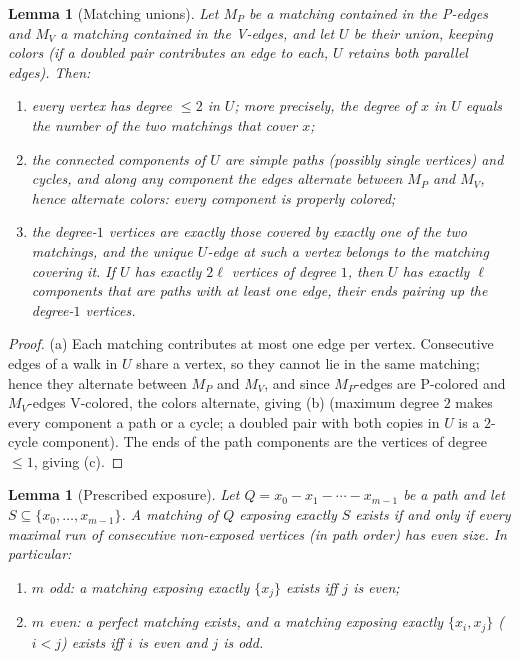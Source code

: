 \documentclass[11pt]{article}
\newtheorem{lemma}[theorem]{Lemma}
\theoremstyle{definition}
\begin{document}
\begin{lemma}[Matching unions]\label{lem:munion}
Let $M_P$ be a matching contained in the P-edges and $M_V$ a matching contained in the
V-edges, and let $U$ be their union, keeping colors (if a doubled pair contributes an
edge to each, $U$ retains both parallel edges). Then:
\begin{enumerate}
\item[(a)] every vertex has degree $\le 2$ in $U$; more precisely, the degree of $x$
in $U$ equals the number of the two matchings that cover $x$;
\item[(b)] the connected components of $U$ are simple paths (possibly single vertices)
and cycles, and along any component the edges alternate between $M_P$ and $M_V$, hence
alternate colors: every component is properly colored;
\item[(c)] the degree-$1$ vertices are exactly those covered by exactly one of the two
matchings, and the unique $U$-edge at such a vertex belongs to the matching covering
it. If $U$ has exactly $2\ell$ vertices of degree $1$, then $U$ has exactly $\ell$
components that are paths with at least one edge, their ends pairing up the degree-$1$
vertices.
\end{enumerate}
\end{lemma}

\begin{proof}
(a) Each matching contributes at most one edge per vertex. Consecutive edges of a walk
in $U$ share a vertex, so they cannot lie in the same matching; hence they alternate
between $M_P$ and $M_V$, and since $M_P$-edges are P-colored and $M_V$-edges V-colored,
the colors alternate, giving (b) (maximum degree $2$ makes every component a path or a
cycle; a doubled pair with both copies in $U$ is a $2$-cycle component). The ends of the
path components are the vertices of degree $\le 1$, giving (c).
\end{proof}

\begin{lemma}[Prescribed exposure]\label{lem:expose}
Let $Q = x_0 - x_1 - \cdots - x_{m-1}$ be a path and let
$S \subseteq \{x_0,\dots,x_{m-1}\}$.
A matching of $Q$ exposing exactly $S$ exists if and only if every maximal run of
consecutive non-exposed vertices (in path order) has even size. In particular:
\begin{enumerate}
\item[(a)] $m$ odd: a matching exposing exactly $\{x_j\}$ exists iff $j$ is even;
\item[(b)] $m$ even: a perfect matching exists, and a matching exposing exactly
$\{x_i, x_j\}$ ($i < j$) exists iff $i$ is even and $j$ is odd.
\end{enumerate}
\end{lemma}
\end{document}
